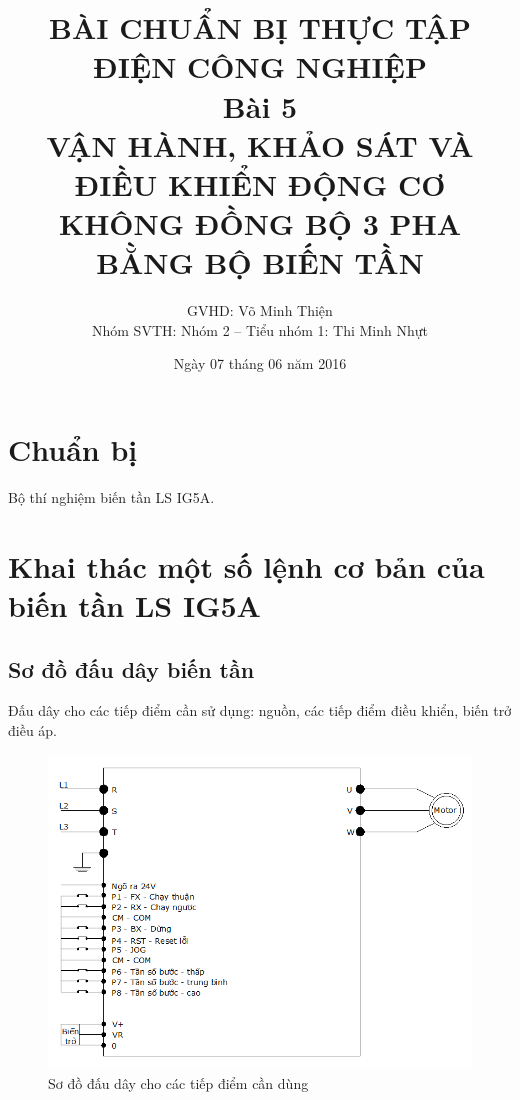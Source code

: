 \documentclass[13pt,a4paper]{extarticle}
\begin{document}
\title{\Large{\textbf{BÀI CHUẨN BỊ THỰC TẬP ĐIỆN CÔNG NGHIỆP}}\\\vspace{1cm}\textbf{Bài 5}\\\vspace{.5cm}\textbf{VẬN HÀNH, KHẢO SÁT VÀ ĐIỀU KHIỂN ĐỘNG CƠ KHÔNG ĐỒNG BỘ 3 PHA BẰNG BỘ BIẾN TẦN}}
\date{Ngày 07 tháng 06 năm 2016}
\author{GVHD: Võ Minh Thiện \vspace{.6cm}\\  Nhóm SVTH: Nhóm 2 -- Tiểu nhóm 1: Thi Minh Nhựt}
\maketitle
\tableofcontents
\newpage
{}
\setcounter{page}{1}
\section{Chuẩn bị}
Bộ thí nghiệm biến tần LS IG5A.
\section{Khai thác một số lệnh cơ bản của biến tần LS IG5A}
\subsection{Sơ đồ đấu dây biến tần}
Đấu dây cho các tiếp điểm cần sử dụng: nguồn, các tiếp điểm điều khiển, biến trở điều áp.
\begin{figure}[!h]
\begin{center}
\includegraphics[scale=.7]{1}
\end{center}
\caption{Sơ đồ đấu dây cho các tiếp điểm cần dùng}
\end{figure}
\end{document}
